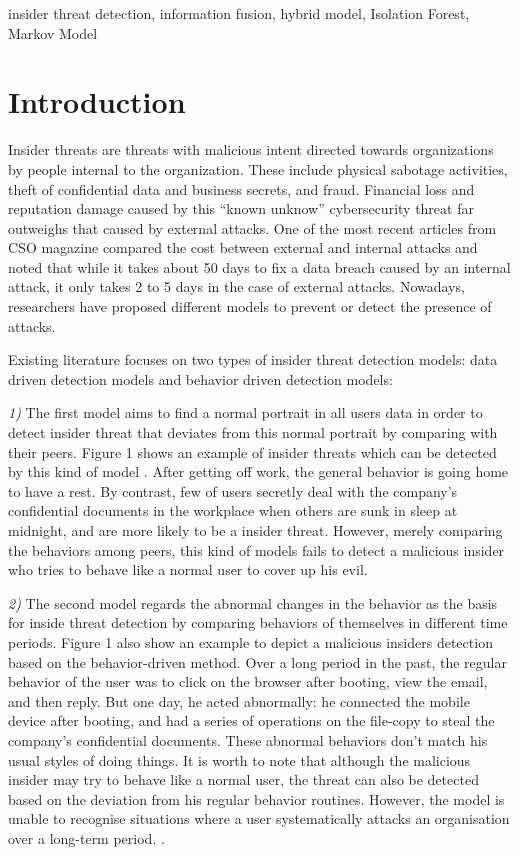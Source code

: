 \documentclass[conference]{IEEEtran}
\begin{document}
\begin{IEEEkeywords}
insider threat detection, information fusion, hybrid model, Isolation Forest, Markov Model
\end{IEEEkeywords}

\section{Introduction}

Insider threats are threats with malicious intent directed towards organizations by people internal to the organization\cite{b1}.
These include physical sabotage activities, theft of confidential data and business secrets, and fraud. Financial loss and reputation damage caused by this ``known unknow'' cybersecurity threat far outweighs that caused by external attacks. One of the most recent articles from CSO magazine\cite{b3} compared the cost between external and internal attacks and noted that while it takes about 50 days to fix a data breach caused by an internal attack, it only takes 2 to 5 days in the case of external attacks. Nowadays, researchers have proposed different models to prevent or detect the presence of attacks.

Existing literature focuses on two types of insider threat detection 
models: data driven detection models \cite{b4}\cite{b5} and behavior driven detection models\cite{b2}\cite{b6}: 

\noindent \emph{1)} The first model aims to find a normal portrait in all users data in order to detect insider threat that deviates from  this normal portrait by comparing with their peers\cite{b10}. Figure 1 shows an example of insider threats which can be detected by this kind of model \cite{b10}. After getting off work, the general behavior is going home to have a rest. By contrast, few of users secretly deal with the company's confidential documents in the workplace when others are sunk in sleep at midnight, and are more likely to be a insider threat. However, merely comparing the behaviors among peers,  this kind of models fails to detect a malicious insider who tries to behave like a normal user to cover up his evil.

\noindent \emph{2)} The second model regards the abnormal changes in the behavior as the basis for inside threat detection by comparing behaviors of themselves in different time periods.
Figure 1 also show an example to depict a malicious insiders detection based on the behavior-driven method\cite{b8}. Over a long period in the past, the regular behavior of the user was to click on the browser after booting, view the email, and then reply. But one day, he acted abnormally: he connected the mobile device after booting, and had a series of operations on the file-copy to steal the company's confidential documents. These abnormal behaviors don't match his usual styles of doing things. It is worth to note that although the malicious insider may try to behave like a normal user, the threat can also be detected based on the deviation from his regular behavior routines.
However, the model is unable to recognise situations where a user systematically attacks an
organisation over a long-term period. \cite{b2}. 
\end{document}
